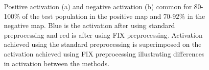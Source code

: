 \begin{figure}[H]%
	\centering
	\qquad
	\caption{Positive activation (a) and negative activation (b) common for 80-100$\percent$ of the test population in the positive map and 70-92$\percent$ in the negative map. Blue is the activation after using standard preprocessing and red is after using FIX preprocessing. Activation achieved using the standard preprocessing is superimposed on the activation achieved using FIX preprocessing illustrating differences in activation between the methods.}
	\label{fig:70}
\end{figure}



